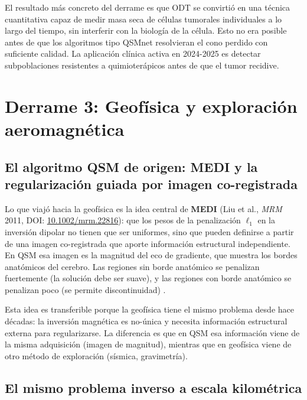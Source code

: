 \documentclass[12pt, a4paper]{article}
\begin{document}
\begin{novedad}
  El resultado más concreto del derrame es que ODT se convirtió en una técnica cuantitativa capaz de medir masa seca de células tumorales individuales a lo largo del tiempo, sin interferir con la biología de la célula. Esto no era posible antes de que los algoritmos tipo QSMnet resolvieran el cono perdido con suficiente calidad. La aplicación clínica activa en 2024-2025 es detectar subpoblaciones resistentes a quimioterápicos antes de que el tumor recidive.
\end{novedad}

\section{Derrame 3: Geofísica y exploración aeromagnética}

\subsection{El algoritmo QSM de origen: MEDI y la regularización guiada por imagen co-registrada}

Lo que viajó hacia la geofísica es la idea central de \textbf{MEDI} (Liu et al., \emph{MRM} 2011, DOI: \href{https://doi.org/10.1002/mrm.22816}{10.1002/mrm.22816}): que los pesos de la penalización $\ell_1$ en la inversión dipolar no tienen que ser uniformes, sino que pueden definirse a partir de una imagen co-registrada que aporte información estructural independiente. En QSM esa imagen es la magnitud del eco de gradiente, que muestra los bordes anatómicos del cerebro. Las regiones sin borde anatómico se penalizan fuertemente (la solución debe ser suave), y las regiones con borde anatómico se penalizan poco (se permite discontinuidad) \cite{Liu2011MEDI}.

Esta idea es transferible porque la geofísica tiene el mismo problema desde hace décadas: la inversión magnética es no-única y necesita información estructural externa para regularizarse. La diferencia es que en QSM esa información viene de la misma adquisición (imagen de magnitud), mientras que en geofísica viene de otro método de exploración (sísmica, gravimetría).

\subsection{El mismo problema inverso a escala kilométrica}
\end{document}
